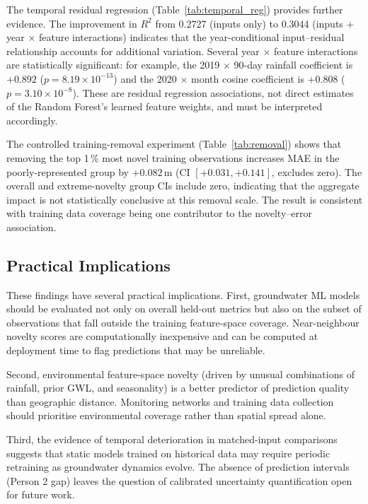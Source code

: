 \documentclass[conference]{IEEEtran}
\begin{document}
The temporal residual regression (Table~\ref{tab:temporal_reg}) provides
further evidence.
The improvement in $R^{2}$ from 0.2727 (inputs only) to 0.3044
(inputs $+$ year $\times$ feature interactions) indicates that the
year-conditional input--residual relationship accounts for additional
variation.
Several year $\times$ feature interactions are statistically significant:
for example, the 2019 $\times$ 90-day rainfall coefficient is $+0.892$
($p = 8.19 \times 10^{-13}$) and the 2020 $\times$ month cosine
coefficient is $+0.808$ ($p = 3.10 \times 10^{-8}$).
These are residual regression associations, not direct estimates of the
Random Forest's learned feature weights, and must be interpreted
accordingly.

The controlled training-removal experiment (Table~\ref{tab:removal})
shows that removing the top 1\,\% most novel training observations
increases MAE in the poorly-represented group by $+0.082$\,m
(CI $[+0.031, +0.141]$, excludes zero).
The overall and extreme-novelty group CIs include zero, indicating that
the aggregate impact is not statistically conclusive at this removal scale.
The result is consistent with training data coverage being one contributor
to the novelty--error association.

\subsection{Practical Implications}

These findings have several practical implications.
First, groundwater ML models should be evaluated not only on overall
held-out metrics but also on the subset of observations that fall outside
the training feature-space coverage.
Near-neighbour novelty scores are computationally inexpensive and can be
computed at deployment time to flag predictions that may be unreliable.

Second, environmental feature-space novelty (driven by unusual
combinations of rainfall, prior GWL, and seasonality) is a better
predictor of prediction quality than geographic distance.
Monitoring networks and training data collection should prioritise
environmental coverage rather than spatial spread alone.

Third, the evidence of temporal deterioration in matched-input comparisons
suggests that static models trained on historical data may require
periodic retraining as groundwater dynamics evolve.
The absence of prediction intervals (Person 2 gap) leaves the question of
calibrated uncertainty quantification open for future work.
\end{document}
